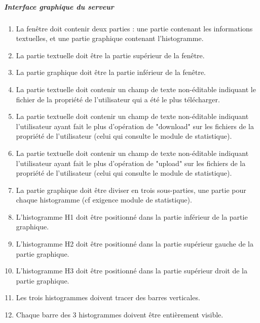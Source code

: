 \documentclass[10pt,a4paper]{report}
\begin{document}
	
	\subparagraph{Interface graphique du serveur}
		\begin{enumerate}
			\item La fenêtre doit contenir deux parties : une partie contenant les informations textuelles, et une partie graphique contenant l'histogramme.

			\item La partie textuelle doit être la partie supérieur de la fenêtre.

			\item La partie graphique doit être la partie inférieur de la fenêtre.

			\item La partie textuelle doit contenir un champ de texte non-éditable indiquant le fichier de la propriété de l'utilisateur qui a été le plus télécharger.

			\item La partie textuelle doit contenir un champ de texte non-éditable indiquant l'utilisateur ayant fait le plus d'opération de "download" sur les fichiers de la propriété de l'utilisateur (celui qui consulte le module de statistique).

			\item La partie textuelle doit contenir un champ de texte non-éditable indiquant l'utilisateur ayant fait le plus d'opération de "upload" sur les fichiers de la propriété de l'utilisateur (celui qui consulte le module de statistique).

			\item La partie graphique doit être diviser en trois sous-parties, une partie pour chaque histogramme (cf exigence module de statistique).

			\item L'histogramme H1 doit être positionné dans la partie inférieur de la partie graphique.

			\item L'histogramme H2 doit être positionné dans la partie supérieur gauche de la partie graphique.

			\item L'histogramme H3 doit être positionné dans la partie supérieur droit de la partie graphique.

			\item Les trois histogrammes doivent tracer des barres verticales.

			\item Chaque barre des 3 histogrammes doivent être entièrement visible.


\end{enumerate}
\end{document}

